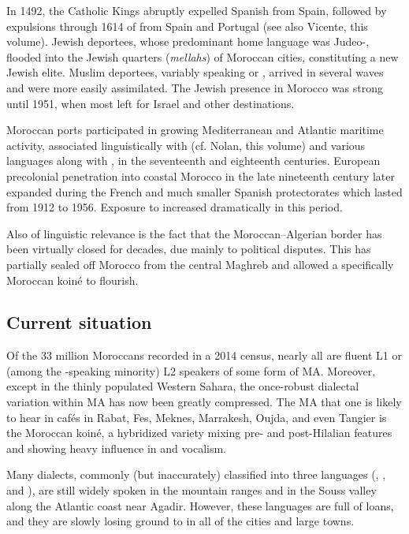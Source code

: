 \documentclass[output=paper]{langsci/langscibook}
\begin{document}
In 1492, the Catholic Kings abruptly expelled Spanish  from Spain, followed by expulsions through 1614 of  from Spain and Portugal (see also Vicente, this volume). Jewish deportees, whose predominant home language was Judeo-, flooded into the Jewish quarters (\textit{mellahs}) of Moroccan cities, constituting a new Jewish elite. Muslim deportees, variably speaking  or , arrived in several waves and were more easily assimilated. The Jewish presence in Morocco was strong until 1951, when most  left for Israel and other destinations.

Moroccan ports participated in growing Mediterranean and Atlantic maritime activity, associated linguistically with  (cf. Nolan, this volume) and various  languages along with , in the seventeenth and eighteenth centuries. European precolonial penetration into coastal Morocco in the late nineteenth century later expanded during the French and much smaller {Spanish} protectorates which lasted from 1912 to 1956. Exposure to  increased dramatically in this period. 

Also of linguistic relevance is the fact that the Moroccan–Algerian border has been virtually closed for decades, due mainly to political disputes. This has partially sealed off Morocco from the central Maghreb and allowed a specifically Moroccan koiné to flourish.

\subsection{Current situation}

Of the 33 million Moroccans recorded in a 2014 census, nearly all are fluent L1 or (among the -speaking minority) L2 speakers of some form of MA. Moreover, except in the thinly populated Western Sahara, the once-robust dialectal variation within MA has now been greatly compressed. The MA that one is likely to hear in cafés in Rabat, Fes, Meknes, Marrakesh, Oujda, and even Tangier is the Moroccan koiné, a hybridized variety mixing pre- and post-Hilalian features and showing heavy  influence in  and vocalism.

Many  dialects, commonly (but inaccurately) classified into three languages (, , and ), are still widely spoken in the mountain ranges and in the Souss valley along the Atlantic coast near Agadir. However, these  languages are full of  loans, and they are slowly losing ground to  in all of the cities and large towns.
\end{document}

